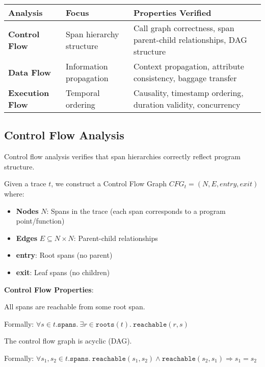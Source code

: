 \begin{table}[h]
\centering
\small
\begin{tabular}{|l|l|p{5cm}|}
\hline
\textbf{Analysis} & \textbf{Focus} & \textbf{Properties Verified} \\
\hline
\textbf{Control Flow} & Span hierarchy structure & Call graph correctness, span parent-child relationships, DAG structure \\
\hline
\textbf{Data Flow} & Information propagation & Context propagation, attribute consistency, baggage transfer \\
\hline
\textbf{Execution Flow} & Temporal ordering & Causality, timestamp ordering, duration validity, concurrency \\
\hline
\end{tabular}
\end{table}

\subsection{Control Flow Analysis}
\label{sec:control-flow}

Control flow analysis verifies that span hierarchies correctly reflect program structure.

\begin{definition}
\label{def:cfg}
Given a trace $t$, we construct a Control Flow Graph $CFG_t = (N, E, entry, exit)$ where:
\begin{itemize}
\item \textbf{Nodes} $N$: Spans in the trace (each span corresponds to a program point/function)
\item \textbf{Edges} $E \subseteq N \times N$: Parent-child relationships
\item \textbf{entry}: Root spans (no parent)
\item \textbf{exit}: Leaf spans (no children)
\end{itemize}
\end{definition}

\textbf{Control Flow Properties}:

\begin{property}[Reachability (CF1)]
\label{prop:cf1}
All spans are reachable from some root span.

Formally: $\forall s \in t.\texttt{spans}.\ \exists r \in \texttt{roots}(t).\ \texttt{reachable}(r, s)$
\end{property}

\begin{property}[Acyclicity (CF2)]
\label{prop:cf2}
The control flow graph is acyclic (DAG).

Formally: $\forall s_1, s_2 \in t.\texttt{spans}.\ \texttt{reachable}(s_1, s_2) \land \texttt{reachable}(s_2, s_1) \Rightarrow s_1 = s_2$
\end{property}

